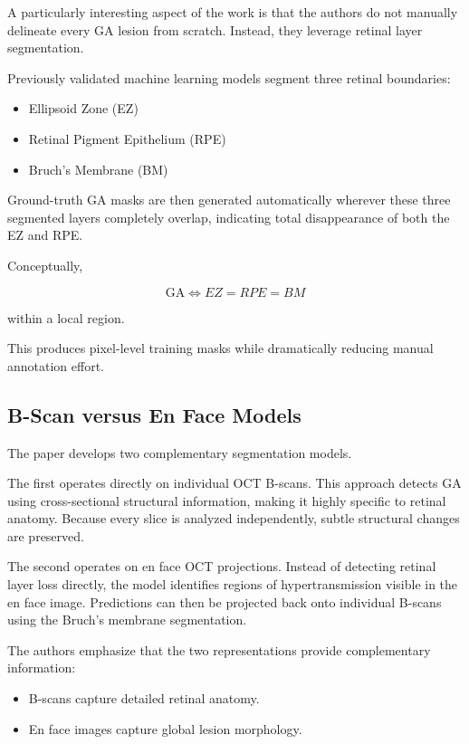 \documentclass[11pt]{article}
\begin{document}
A particularly interesting aspect of the work is that the authors do not manually delineate every GA lesion from scratch. Instead, they leverage retinal layer segmentation.

Previously validated machine learning models segment three retinal boundaries:

\begin{itemize}
    \item Ellipsoid Zone (EZ)
    \item Retinal Pigment Epithelium (RPE)
    \item Bruch's Membrane (BM)
\end{itemize}

Ground-truth GA masks are then generated automatically wherever these three segmented layers completely overlap, indicating total disappearance of both the EZ and RPE.

Conceptually,

\[
\text{GA} \Longleftrightarrow
EZ = RPE = BM
\]

within a local region.

This produces pixel-level training masks while dramatically reducing manual annotation effort.

\subsection{B-Scan versus En Face Models}

The paper develops two complementary segmentation models.

The first operates directly on individual OCT B-scans. This approach detects GA using cross-sectional structural information, making it highly specific to retinal anatomy. Because every slice is analyzed independently, subtle structural changes are preserved.

The second operates on en face OCT projections. Instead of detecting retinal layer loss directly, the model identifies regions of hypertransmission visible in the en face image. Predictions can then be projected back onto individual B-scans using the Bruch's membrane segmentation.

The authors emphasize that the two representations provide complementary information:

\begin{itemize}
    \item B-scans capture detailed retinal anatomy.
    \item En face images capture global lesion morphology.
\end{itemize}
\end{document}
